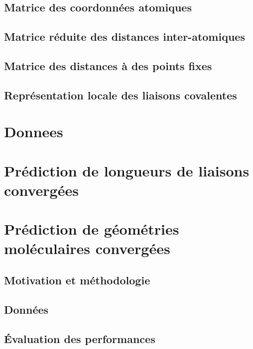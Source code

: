 \documentclass{report}
\begin{document}
	\section{Matrice des coordonnées atomiques}
		

	\section{Matrice réduite des distances inter-atomiques}
		
		
	\section{Matrice des distances à des points fixes}
		
		
	\section{Représentation locale des liaisons covalentes}
		

\chapter{Donnees}

\chapter{Prédiction de longueurs de liaisons convergées}

\chapter{Prédiction de géométries moléculaires convergées}
	\section{Motivation et méthodologie}
		
		
	 \section{Données}
		

	\section{Évaluation des performances}
		
		
\end{document}
